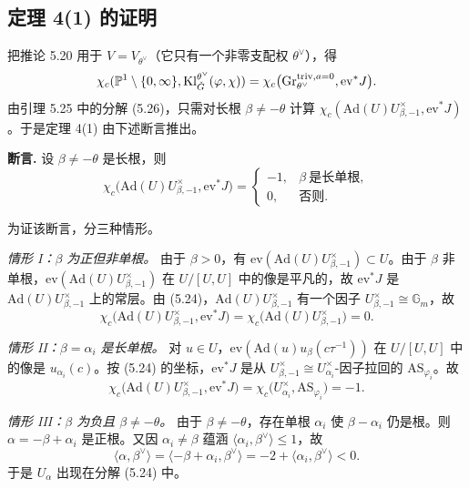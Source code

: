 \subsection{定理 4(1) 的证明}

把推论 5.20 用于 $V=V_{\theta^\vee}$（它只有一个非零支配权 $\theta^\vee$），得
\[
\chi_c(\mathbb{P}^1\setminus\{0,\infty\},\mathrm{Kl}^{\theta^\vee}_{\check G}(\varphi,\chi))=\chi_c\big(\mathrm{Gr}^{\mathrm{triv},a=0}_{\theta^\vee},\mathrm{ev}^*J\big).
\]
由引理 5.25 中的分解 (5.26)，只需对长根 $\beta\neq-\theta$ 计算 $\chi_c(\mathrm{Ad}(U)U^\times_{\beta,-1},\mathrm{ev}^*J)$。于是定理 4(1) 由下述断言推出。

\medskip\noindent\textbf{断言.} 设 $\beta\neq-\theta$ 是长根，则
\[
\chi_c\big(\mathrm{Ad}(U)U^\times_{\beta,-1},\mathrm{ev}^*J\big)=
\begin{cases}
-1,&\beta\ \text{是长单根},\\
0,&\text{否则}.
\end{cases}
\]

为证该断言，分三种情形。

\emph{情形 I：$\beta$ 为正但非单根。} 由于 $\beta>0$，有 $\mathrm{ev}(\mathrm{Ad}(U)U^\times_{\beta,-1})\subset U$。由于 $\beta$ 非单根，$\mathrm{ev}(\mathrm{Ad}(U)U^\times_{\beta,-1})$ 在 $U/[U,U]$ 中的像是平凡的，故 $\mathrm{ev}^*J$ 是 $\mathrm{Ad}(U)U^\times_{\beta,-1}$ 上的常层。由 (5.24)，$\mathrm{Ad}(U)U^\times_{\beta,-1}$ 有一个因子 $U^\times_{\beta,-1}\cong\mathbb{G}_m$，故
\[
\chi_c\big(\mathrm{Ad}(U)U^\times_{\beta,-1},\mathrm{ev}^*J\big)=\chi_c\big(\mathrm{Ad}(U)U^\times_{\beta,-1}\big)=0.
\]

\emph{情形 II：$\beta=\alpha_i$ 是长单根。} 对 $u\in U$，$\mathrm{ev}(\mathrm{Ad}(u)u_\beta(c\tau^{-1}))$ 在 $U/[U,U]$ 中的像是 $u_{\alpha_i}(c)$。按 (5.24) 的坐标，$\mathrm{ev}^*J$ 是从 $U^\times_{\beta,-1}\cong U^\times_{\alpha_i}$-因子拉回的 $\mathrm{AS}_{\varphi_i}$。故
\[
\chi_c\big(\mathrm{Ad}(U)U^\times_{\beta,-1},\mathrm{ev}^*J\big)=\chi_c\big(U^\times_{\alpha_i},\mathrm{AS}_{\varphi_i}\big)=-1.
\]

\emph{情形 III：$\beta$ 为负且 $\beta\neq-\theta$。} 由于 $\beta\neq-\theta$，存在单根 $\alpha_i$ 使 $\beta-\alpha_i$ 仍是根。则 $\alpha=-\beta+\alpha_i$ 是正根。又因 $\alpha_i\neq\beta$ 蕴涵 $\langle\alpha_i,\beta^\vee\rangle\le 1$，故
\[
\langle\alpha,\beta^\vee\rangle=\langle-\beta+\alpha_i,\beta^\vee\rangle=-2+\langle\alpha_i,\beta^\vee\rangle<0.
\]
于是 $U_\alpha$ 出现在分解 (5.24) 中。

